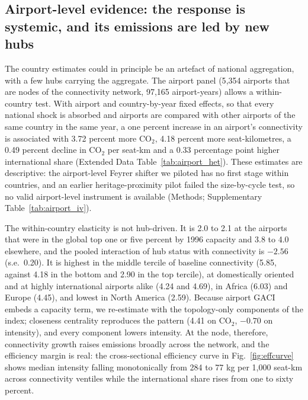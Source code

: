 \documentclass[12pt]{article}
\begin{document}
\subsection*{Airport-level evidence: the response is systemic, and its
emissions are led by new hubs}
The country estimates could in principle be an artefact of national
aggregation, with a few hubs carrying the aggregate. The airport panel
(5{,}354 airports that are nodes of the connectivity network, 97{,}165
airport-years) allows a within-country test. With airport and
country-by-year fixed effects, so that every national shock is absorbed and
airports are compared with other airports of the same country in the same
year, a one percent increase in an airport's connectivity is associated
with 3.72 percent more CO$_2$, 4.18 percent more seat-kilometres, a 0.49
percent decline in CO$_2$ per seat-km and a 0.33 percentage point higher
international share (Extended Data Table~\ref{tab:airport_het}). These
estimates are descriptive: the airport-level Feyrer shifter we piloted has
no first stage within countries, and an earlier heritage-proximity pilot
failed the size-by-cycle test, so no valid airport-level instrument is
available (Methods; Supplementary Table~\ref{tab:airport_iv}).

The within-country elasticity is not hub-driven. It is 2.0 to 2.1 at the
airports that were in the global top one or five percent by 1996 capacity
and 3.8 to 4.0 elsewhere, and the pooled interaction of hub status with
connectivity is $-2.56$ (s.e.\ 0.20). It is highest in the middle tercile
of baseline connectivity (5.85, against 4.18 in the bottom and 2.90 in the
top tercile), at domestically oriented and at highly international airports
alike (4.24 and 4.69), in Africa (6.03) and Europe (4.45), and lowest in
North America (2.59). Because airport GACI embeds a capacity term, we
re-estimate with the topology-only components of the index; closeness
centrality reproduces the pattern (4.41 on CO$_2$, $-0.70$ on intensity),
and every component lowers intensity. At the node, therefore, connectivity
growth raises emissions broadly across the network, and the efficiency
margin is real: the cross-sectional efficiency curve in
Fig.~\ref{fig:effcurve} shows median intensity falling monotonically from
284 to 77 kg per 1{,}000 seat-km across connectivity ventiles while the
international share rises from one to sixty percent.
\end{document}
